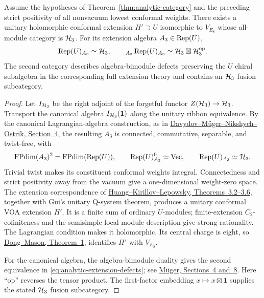 \begin{theorem}
\label{thm:analytic-e8-extension}
Assume the hypotheses of Theorem~\ref{thm:analytic-category} and the
preceding strict positivity of all nonvacuum lowest conformal weights.
There exists a unitary holomorphic conformal extension $H'\supset U$
isomorphic to $V_{E_8}$ whose all-module category is $\mathcal H_3$.
For its extension algebra $A_3\in\operatorname{Rep}(U)$,
\begin{equation}
 \operatorname{Rep}(U)_{A_3}\simeq\mathcal H_3,
 \qquad
 {}_{A_3}\operatorname{Rep}(U)_{A_3}\simeq\mathcal H_3\boxtimes\mathcal H_3^{\mathrm{op}}.
 \label{eq:analytic-extension-defects}
\end{equation}
The second category describes algebra-bimodule defects preserving the
$U$ chiral subalgebra in the corresponding full extension theory and
contains an $\mathcal H_3$ fusion subcategory.
\end{theorem}
\begin{proof}
Let $I_{\mathcal H_3}$ be the right adjoint of the forgetful functor
$Z(\mathcal H_3)\to\mathcal H_3$.  Transport the canonical algebra
$I_{\mathcal H_3}(\mathbf1)$ along the unitary ribbon equivalence.  By the
canonical Lagrangian-algebra construction, as in
\href{https://arxiv.org/abs/1009.2117}
{Davydov--M\"uger--Nikshych--Ostrik, Section~4}, the resulting $A_3$
is connected, commutative, separable, and twist-free, with
\[
 \operatorname{FPdim}(A_3)^2=\operatorname{FPdim}(\operatorname{Rep}(U)),
 \qquad \operatorname{Rep}(U)_{A_3}^{0}\simeq\mathrm{Vec},
 \qquad \operatorname{Rep}(U)_{A_3}\simeq\mathcal H_3.
\]
Trivial twist makes its constituent conformal weights integral.
Connectedness and strict positivity away from the vacuum give a
one-dimensional weight-zero space.  The extension correspondence of
\href{https://arxiv.org/html/1406.3420}
{Huang--Kirillov--Lepowsky, Theorems~3.2--3.6}, together with Gui's
unitary Q-system theorem, produces a unitary conformal VOA extension
$H'$.  It is a finite sum of ordinary $U$-modules; finite-extension
$C_2$-cofiniteness and the semisimple local-module description give
strong rationality.  The Lagrangian condition makes it holomorphic.
Its central charge is eight, so
\href{https://msp.org/pjm/2004/213-2/pjm-v213-n2-p05-p.pdf}
{Dong--Mason, Theorem~1}, identifies $H'$ with $V_{E_8}$.

For the canonical algebra, the algebra-bimodule duality gives the
second equivalence in \eqref{eq:analytic-extension-defects}; see
\href{https://arxiv.org/abs/math/0111205}
{M\"uger, Sections~4 and~8}.  Here ``op'' reverses the tensor product.
The first-factor embedding $x\mapsto x\boxtimes\mathbf1$ supplies
the stated $\mathcal H_3$ fusion subcategory.
\end{proof}

